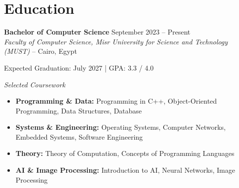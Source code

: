 \section*{Education}

\textbf{Bachelor of Computer Science} \hfill September 2023 -- Present \\
\textit{Faculty of Computer Science, Misr University for Science and
Technology (MUST)} -- Cairo, Egypt

\vspace{2pt}
Expected Graduation: July 2027 \quad | \quad GPA: 3.3 / 4.0

\vspace{6pt}
\textit{Selected Coursework}
\begin{itemize}
    \item \textbf{Programming \& Data:} Programming in C++, Object-Oriented Programming, Data Structures, Database
    \item \textbf{Systems \& Engineering:} Operating Systems, Computer Networks, Embedded Systems, Software Engineering
    \item \textbf{Theory:} Theory of Computation, Concepts of Programming Languages
    \item \textbf{AI \& Image Processing:} Introduction to AI, Neural Networks, Image Processing
\end{itemize}
